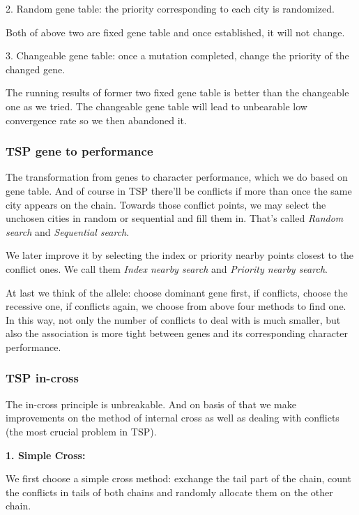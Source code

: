 \documentclass{acmtog} %
\begin{document}
2. Random gene table: the priority corresponding to each city is randomized.

Both of above two are fixed gene table and once established, it will not change.

3. Changeable gene table: once a mutation completed, change the priority of the changed gene.

The running results of former two fixed gene table is better than the changeable one as we tried. The changeable gene table will lead to unbearable low convergence rate so we then abandoned it.


\subsubsection{TSP gene to performance}
\label{subsubsec:tspperformance}
\qquad

The transformation from genes to character performance, which we do based on gene table. And of course in TSP there’ll be conflicts if more than once the same city appears on the chain. Towards those conflict points, we may select the unchosen cities in random or sequential and fill them in. That's called \emph{Random search} and \emph{Sequential search}.

We later improve it by selecting the index or priority nearby points closest to the conflict ones. We call them \emph{Index nearby search} and \emph{Priority nearby search}.

At last we think of the allele: choose dominant gene first, if conflicts, choose the recessive one, if conflicts again, we choose from above four methods to find one. In this way, not only the number of conflicts to deal with is much smaller, but also the association is more tight between genes and its corresponding character performance.


\subsubsection{TSP in-cross}
\label{subsubsec:tspcross}
\qquad

The in-cross principle is unbreakable. And on basis of that we make improvements on the method of internal cross as well as dealing with conflicts (the most crucial problem in TSP).

\qquad

{\bfseries 1. Simple Cross:}

We first choose a simple cross method: exchange the tail part of the chain, count the conflicts in tails of both chains and randomly allocate them on the other chain.
\end{document}
